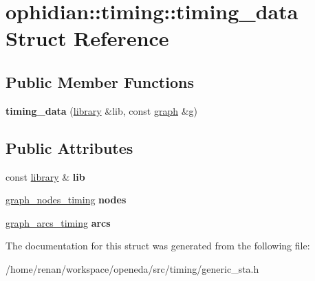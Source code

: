 \hypertarget{structophidian_1_1timing_1_1timing__data}{\section{ophidian\-:\-:timing\-:\-:timing\-\_\-data Struct Reference}
\label{structophidian_1_1timing_1_1timing__data}
}
\subsection*{Public Member Functions}
\begin{DoxyCompactItemize}
\item 
\hypertarget{structophidian_1_1timing_1_1timing__data_a4a37504d4635eb97de5c936fc7fb9bc5}{{\bfseries timing\-\_\-data} (\hyperlink{classophidian_1_1timing_1_1library}{library} \&lib, const \hyperlink{classophidian_1_1timing_1_1graph}{graph} \&g)}\label{structophidian_1_1timing_1_1timing__data_a4a37504d4635eb97de5c936fc7fb9bc5}

\end{DoxyCompactItemize}
\subsection*{Public Attributes}
\begin{DoxyCompactItemize}
\item 
\hypertarget{structophidian_1_1timing_1_1timing__data_a6567b40b81a54734ad9458fbf4114e2c}{const \hyperlink{classophidian_1_1timing_1_1library}{library} \& {\bfseries lib}}\label{structophidian_1_1timing_1_1timing__data_a6567b40b81a54734ad9458fbf4114e2c}

\item 
\hypertarget{structophidian_1_1timing_1_1timing__data_ad116ea4b6a15a5db0522431d807538cf}{\hyperlink{classophidian_1_1timing_1_1graph__nodes__timing}{graph\-\_\-nodes\-\_\-timing} {\bfseries nodes}}\label{structophidian_1_1timing_1_1timing__data_ad116ea4b6a15a5db0522431d807538cf}

\item 
\hypertarget{structophidian_1_1timing_1_1timing__data_a7bfd3056aaa8382e5a823f3ffbf924c3}{\hyperlink{classophidian_1_1timing_1_1graph__arcs__timing}{graph\-\_\-arcs\-\_\-timing} {\bfseries arcs}}\label{structophidian_1_1timing_1_1timing__data_a7bfd3056aaa8382e5a823f3ffbf924c3}

\end{DoxyCompactItemize}


The documentation for this struct was generated from the following file\-:\begin{DoxyCompactItemize}
\item 
/home/renan/workspace/openeda/src/timing/generic\-\_\-sta.\-h\end{DoxyCompactItemize}
